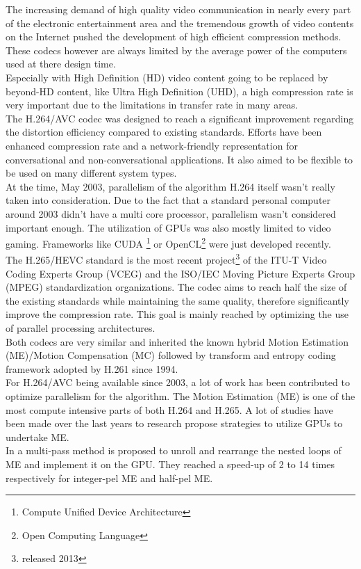 The increasing demand of high quality video communication in nearly every part of the electronic entertainment area and the tremendous growth of video contents on the Internet pushed the development of high efficient compression methods. These codecs however are always limited by the average power of the computers used at there design time. \\
Especially with High Definition (HD) video content going to be replaced by beyond-HD content, like Ultra High Definition (UHD), a high compression rate is very important due to the limitations in transfer rate in many areas.\\
The H.264/AVC \cite{H264_Overview} codec was designed to reach a significant improvement regarding the distortion efficiency compared to existing standards. Efforts have been enhanced compression rate and a network-friendly representation for conversational and non-conversational applications. It also aimed to be flexible to be used on many different system types.\\
At the time, May 2003, parallelism of the algorithm H.264 itself wasn't really taken into consideration. Due to the fact that a standard personal computer around 2003 didn't have a multi core processor, parallelism wasn't considered important enough. The utilization of GPUs was also mostly limited to video gaming. Frameworks like CUDA \footnote{Compute Unified Device Architecture} or OpenCL\footnote{Open Computing Language} were just developed recently.\\
The H.265/HEVC \cite{H265_Overview} standard is the most recent project\footnote{released 2013} of the ITU-T Video Coding Experts Group (VCEG) and the ISO/IEC Moving
Picture Experts Group (MPEG) standardization organizations. The codec aims to reach half the size of the existing standards while maintaining the same quality, therefore significantly improve the compression rate. This goal is mainly reached by optimizing the use of parallel processing architectures.\\
Both codecs are very similar and inherited the known hybrid Motion Estimation (ME)/Motion Compensation (MC) followed by transform and entropy coding framework adopted by H.261 \cite{H261_Overview} since 1994.\\

For H.264/AVC being available since 2003, a lot of work has been contributed to optimize parallelism for the algorithm. The Motion Estimation (ME) is one of the most compute intensive parts of both H.264 and H.265. A lot of studies have been made over the last years to research propose strategies to utilize GPUs to undertake ME. \\
In \cite{ME1} a multi-pass method is proposed to unroll and rearrange the nested loops of ME and implement it on the GPU. They reached a speed-up of 2 to 14 times respectively for integer-pel ME and half-pel ME.\\

